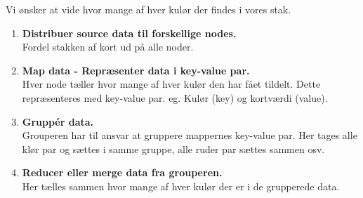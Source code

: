Vi ønsker at vide hvor mange af hver kulør der findes i vores stak.
\begin{enumerate}
	\item \textbf{Distribuer source data til forskellige nodes.}\\
	Fordel stakken af kort ud på alle noder.
	\item \textbf{Map data - Repræsenter data i key-value par.}\\
	Hver node tæller hvor mange af hver kulør den har fået tildelt. Dette repræsenteres med key-value par. eg. Kulør (key) og kortværdi (value).
	\item \textbf{Gruppér data.} \\
	Grouperen har til ansvar at gruppere mappernes key-value par. Her tages alle klør par og sættes i samme gruppe, alle ruder par sættes sammen osv.
	\item \textbf{Reducer eller merge  data fra grouperen.}\\
	Her tælles sammen hvor mange af hver kulør der er i de grupperede data.
\end{enumerate}
